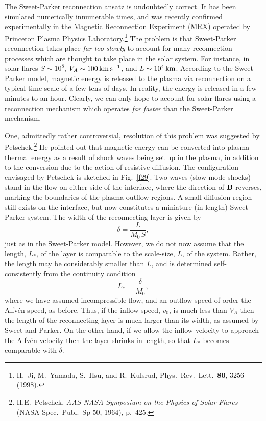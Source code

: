 The Sweet-Parker reconnection ansatz  is undoubtedly correct.
It has been simulated numerically innumerable times, and was recently
confirmed experimentally in the Magnetic Reconnection Experiment (MRX)
operated by Princeton Plasma Physics Laboratory.\footnote{
H.~Ji, M.~Yamada, S.~Hsu, and R.~Kulsrud,  Phys.\ Rev.\ Lett.\ {\bf 80},
 3256 (1998).}  The problem is that
Sweet-Parker reconnection takes place {\em far too slowly} to account for
many reconnection processes which are thought to take place in the
solar system. For instance, in solar flares $S\sim 10^8$, $V_A\sim 100\,{\rm km}\,{\rm s}^{-1}$, and $L\sim 10^4\,{\rm km}$. According to the
Sweet-Parker model, magnetic energy is released to the plasma via
reconnection on a typical time-scale of a few tens of days. In reality,
the energy is released in a few minutes to an hour. Clearly, we can only hope to
account for solar flares using a reconnection mechanism which operates
{\em far faster} than the Sweet-Parker mechanism.

One, admittedly rather controversial, resolution of this problem was suggested by
Petschek.\footnote{H.E.~Petschek, {\em AAS-NASA Symposium on the Physics
of Solar Flares} (NASA Spec.\ Publ.\ Sp-50, 1964), p.~425.} He pointed
out that magnetic energy can be converted into plasma thermal energy as a
result of shock waves being set up in the plasma, in addition to the
conversion due to the action of resistive
diffusion. The configuration envisaged by Petschek is sketched in Fig.~\ref{f29}.
Two waves (slow mode shocks) stand in the flow on either side of the
interface, where the direction of ${\bf B}$ reverses, marking the
boundaries of the plasma outflow regions. A small diffusion region still
exists on the interface, but now constitutes a miniature (in length)
Sweet-Parker system. The width of the reconnecting layer is
given by 
\begin{equation}
\delta = \frac{L}{M_0\,S},
\end{equation}
just as in the Sweet-Parker model. However, we do not now assume that the
length, $L_\ast$, of the layer is comparable to the scale-size, $L$, 
of the system. Rather, the length may be considerably smaller than $L$, and
is determined self-consistently from the continuity condition
\begin{equation}
L_\ast = \frac{\delta}{M_0},
\end{equation}
where we have assumed incompressible flow, and an outflow speed of
order the Alfv\'{e}n speed, as before. Thus, if the inflow speed, $v_0$, is
much less than $V_A$ then the length of the reconnecting layer
is much larger than its width, as assumed by Sweet and Parker. On the
other hand, if we allow the inflow velocity to
approach the Alfv\'{e}n velocity then the layer shrinks in length, so that
$L_\ast$ becomes comparable with $\delta$. 

